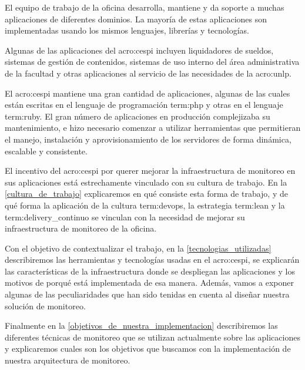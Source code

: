 El equipo de trabajo de la oficina desarrolla, mantiene y da soporte a muchas
aplicaciones de diferentes dominios. La mayoría de estas aplicaciones son
implementadas usando los mismos lenguajes, librerías y tecnologías.

Algunas de las aplicaciones del \gls{acro:cespi} incluyen liquidadores de sueldos,
sistemas de gestión de contenidos, sistemas de uso interno del área
administrativa de la facultad y otras aplicaciones al servicio de las
necesidades de la \gls{acro:unlp}.

El \gls{acro:cespi} mantiene una gran cantidad de aplicaciones, algunas de las
cuales están escritas en el lenguaje de programación \gls{term:php} y otras en
el lenguaje \gls{term:ruby}. El gran número de aplicaciones en producción
complejizaba su mantenimiento, e hizo necesario comenzar a utilizar
herramientas que permitieran el manejo, instalación y aprovisionamiento de los
servidores de forma dinámica, escalable y consistente.

El incentivo del \gls{acro:cespi} por querer mejorar la infraestructura de
monitoreo en sus aplicaciones está estrechamente vinculado con su cultura de
trabajo. En la \autoref{cultura_de_trabajo} explicaremos en qué consiste esta
forma de trabajo, y de qué forma la aplicación de la cultura \gls{term:devops},
la estrategia \gls{term:lean} y la \gls{term:delivery_continuo} se vinculan con
la necesidad de mejorar su infraestructura de monitoreo de la oficina.

Con el objetivo de contextualizar el trabajo, en la
\autoref{tecnologias_utilizadas} describiremos las herramientas y tecnologías
usadas en el \gls{acro:cespi}, se explicarán las características de la
infraestructura donde se despliegan las aplicaciones y los motivos de porqué
está implementada de esa manera. Además, vamos a exponer algunas de las
peculiaridades que han sido tenidas en cuenta al diseñar nuestra solución de
monitoreo.

Finalmente en la \autoref{objetivos_de_nuestra_implementacion} describiremos
las diferentes técnicas de monitoreo que se utilizan actualmente sobre las
aplicaciones y explicaremos cuales son los objetivos que buscamos con la
implementación de nuestra arquitectura de monitoreo.
